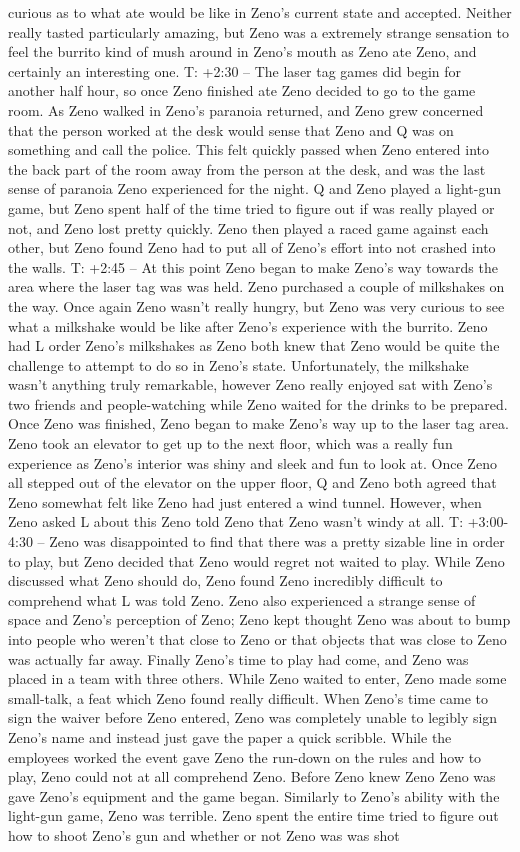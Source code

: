 \documentclass[12pt]{book}
\begin{document}
curious as to what ate would be like in Zeno's current state and accepted. Neither really tasted particularly amazing, but Zeno was a extremely strange sensation to feel the burrito kind of mush around in Zeno's mouth as Zeno ate Zeno, and certainly an interesting one. T: +2:30 -- The laser tag games did begin for another half hour, so once Zeno finished ate Zeno decided to go to the game room. As Zeno walked in Zeno's paranoia returned, and Zeno grew concerned that the person worked at the desk would sense that Zeno and Q was on something and call the police. This felt quickly passed when Zeno entered into the back part of the room away from the person at the desk, and was the last sense of paranoia Zeno experienced for the night. Q and Zeno played a light-gun game, but Zeno spent half of the time tried to figure out if was really played or not, and Zeno lost pretty quickly. Zeno then played a raced game against each other, but Zeno found Zeno had to put all of Zeno's effort into not crashed into the walls. T: +2:45 -- At this point Zeno began to make Zeno's way towards the area where the laser tag was was held. Zeno purchased a couple of milkshakes on the way. Once again Zeno wasn't really hungry, but Zeno was very curious to see what a milkshake would be like after Zeno's experience with the burrito. Zeno had L order Zeno's milkshakes as Zeno both knew that Zeno would be quite the challenge to attempt to do so in Zeno's state. Unfortunately, the milkshake wasn't anything truly remarkable, however Zeno really enjoyed sat with Zeno's two friends and people-watching while Zeno waited for the drinks to be prepared. Once Zeno was finished, Zeno began to make Zeno's way up to the laser tag area. Zeno took an elevator to get up to the next floor, which was a really fun experience as Zeno's interior was shiny and sleek and fun to look at. Once Zeno all stepped out of the elevator on the upper floor, Q and Zeno both agreed that Zeno somewhat felt like Zeno had just entered a wind tunnel. However, when Zeno asked L about this Zeno told Zeno that Zeno wasn't windy at all. T: +3:00-4:30 -- Zeno was disappointed to find that there was a pretty sizable line in order to play, but Zeno decided that Zeno would regret not waited to play. While Zeno discussed what Zeno should do, Zeno found Zeno incredibly difficult to comprehend what L was told Zeno. Zeno also experienced a strange sense of space and Zeno's perception of Zeno; Zeno kept thought Zeno was about to bump into people who weren't that close to Zeno or that objects that was close to Zeno was actually far away. Finally Zeno's time to play had come, and Zeno was placed in a team with three others. While Zeno waited to enter, Zeno made some small-talk, a feat which Zeno found really difficult. When Zeno's time came to sign the waiver before Zeno entered, Zeno was completely unable to legibly sign Zeno's name and instead just gave the paper a quick scribble. While the employees worked the event gave Zeno the run-down on the rules and how to play, Zeno could not at all comprehend Zeno. Before Zeno knew Zeno Zeno was gave Zeno's equipment and the game began. Similarly to Zeno's ability with the light-gun game, Zeno was terrible. Zeno spent the entire time tried to figure out how to shoot Zeno's gun and whether or not Zeno was was shot 
\end{document}

